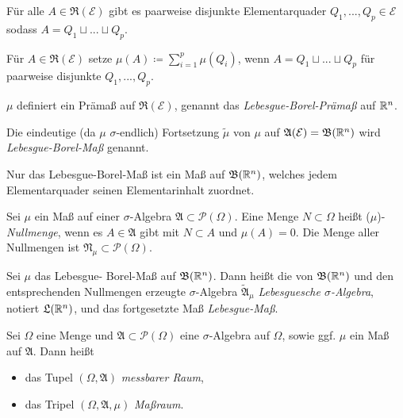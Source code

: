 \documentclass{cheat-sheet}
\newcommand{\PS}{\mathcal{P}} %
\newcommand{\PSO}{\PS(\Omega)} %
\newcommand{\Alg}{\mathfrak{A}} %
\newcommand{\Ring}{\mathfrak{R}} %
\newcommand{\Bor}{\mathfrak{B}} %
\begin{document}
\begin{satz}
  Für alle $A \in \Ring(\mathcal{E})$ gibt es paarweise disjunkte Elementarquader $Q_1, ..., Q_p \in \mathcal{E}$ sodass $A = Q_1 \sqcup ... \sqcup Q_p$.
\end{satz}

\begin{defn}
  Für $A \in \Ring(\mathcal{E})$ setze $\mu(A) \coloneqq \textstyle\sum_{i = 1}^p \mu(Q_i)$, wenn $A = Q_1 \sqcup ... \sqcup Q_p$ für paarweise disjunkte $Q_1, ..., Q_p$.
\end{defn}

\begin{satz}
  $\mu$ definiert ein Prämaß auf $\Ring(\mathcal{E})$, genannt das \emph{Lebesgue-Borel-Prämaß} auf $\mathbb{R}^n$.
\end{satz}

\begin{defn}
  Die eindeutige (da $\mu$ $\sigma$-endlich) Fortsetzung $\tilde{\mu}$ von $\mu$ auf $\Alg(\mathcal{E}) = \Bor(\R^n)$ wird \emph{Lebesgue-Borel-Maß} genannt.
\end{defn}

\begin{bem}
  Nur das Lebesgue-Borel-Maß ist ein Maß auf $\Bor(\R^n)$, welches jedem Elementarquader seinen Elementarinhalt zuordnet.
\end{bem}

\begin{defn}
  Sei $\mu$ ein Maß auf einer $\sigma$-Algebra $\Alg \subset \PSO$. Eine Menge $N \subset \Omega$ heißt ($\mu$)-\emph{Nullmenge}, wenn es $A \in \Alg$ gibt mit $N \subset A$ und $\mu(A) = 0$. Die Menge aller Nullmengen ist $\mathfrak{N}_\mu \subset \PSO$.
\end{defn}

\begin{defn}
  Sei $\mu$ das Lebesgue- Borel-Maß auf $\Bor(\R^n)$. Dann heißt die von $\Bor(\R^n)$ und den ent\-sprech\-en\-den Nullmengen erzeugte $\sigma$-Algebra $\tilde{\Alg}_\mu$ \emph{Lebesguesche $\sigma$-Algebra}, notiert $\mathfrak{L}(\mathbb{R}^n)$, und das fortgesetzte Maß \emph{Lebesgue-Maß}.
\end{defn}

\begin{defn}
  Sei $\Omega$ eine Menge und $\Alg \subset \PSO$ eine $\sigma$-Algebra auf $\Omega$, sowie ggf. $\mu$ ein Maß auf $\Alg$. Dann heißt
  \begin{itemize}
    \item das Tupel $(\Omega, \Alg)$ \emph{messbarer Raum},
    \item das Tripel $(\Omega, \Alg, \mu)$ \emph{Maßraum}.
  \end{itemize}
\end{defn}
\end{document}
